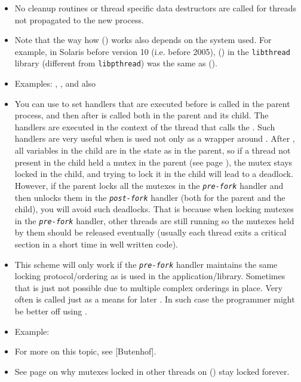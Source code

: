 \begin{itemize}
\item No cleanup routines or thread specific data destructors are called for
threads not propagated to the new process.
\item {} Note that the way how () works also depends on
the system used.  For example, in Solaris before version 10 (i.e. before 2005),
() in the \texttt{libthread} library (different from
\texttt{libpthread}) was the same as ().
\item Examples: ,
, and also 
\item {} You can use  to set handlers that
are executed before  is called in the parent process, and then after
 is called both in the parent and its child.  The handlers are
executed in the context of the thread that calls the .  Such
handlers are very useful when  is used not only as a wrapper
around .  After , all variables in the child are in
the state as in the parent, so if a thread not present in the child held a mutex
in the parent (see page \pageref{MUTEXES}), the mutex stays locked in the child,
and trying to lock it in the child will lead to a deadlock.  However, if the
parent locks all the mutexes in the \emph{\texttt{pre-fork}} handler and then
unlocks them in the \emph{\texttt{post-fork}} handler (both for the parent and
the child), you will avoid such deadlocks.  That is because when locking mutexes
in the \emph{\texttt{pre-fork}} handler, other threads are still running so the
mutexes held by them should be released eventually (usually each thread exits a
critical section in a short time in well written code).
\item This scheme will only work if the \emph{\texttt{pre-fork}} handler
maintains the same locking protocol/ordering as is used in the
application/library. Sometimes that is just not possible due to multiple complex
orderings in place. Very often  is called just as a means for
later . In such case the programmer might be better off using
.
\item Example: 
\item For more on this topic, see [Butenhof].
\item See page \pageref{MUTEXES} on why mutexes locked in other threads on
() stay locked forever.
\end{itemize}

